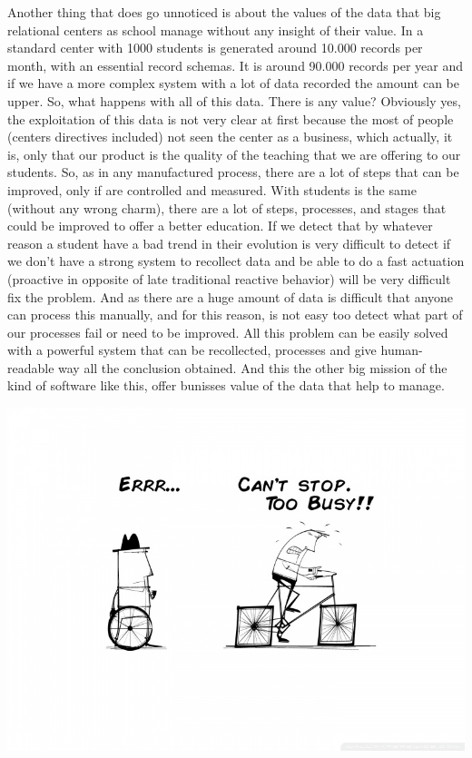 Another thing that does go unnoticed is about the values of the data that big
relational centers as school manage without any insight of their value.
In a standard center with 1000 students is generated around 10.000 records per
month, with an essential record schemas.
\intro
It is around 90.000 records per year
and if we have a more complex system with a lot of data recorded the amount can be upper.
So, what happens with all of this data. There is any value? Obviously yes,
the exploitation of this data is not very clear at first because the most of
people (centers directives included) not seen the center as a business, which
actually, it is, only that our product is the quality of the teaching that we are
offering to our students.
\intro
So, as in any manufactured process, there are a lot of steps that can be improved,
only if are controlled and measured. With students is the same (without any wrong
charm), there are a lot of steps, processes, and stages that could be improved to
offer a better education.
If we detect that by whatever reason a student have a bad trend in their evolution
is very difficult to detect if we don't have a strong system to recollect data
and be able to do a fast actuation (proactive in opposite of late traditional
reactive behavior) will be very difficult fix the problem.
\intro
And as there are a huge amount of data is difficult that anyone can process this
manually, and for this reason, is not easy too detect what part of our processes
fail or need to be improved.
All this problem can be easily solved with a powerful system that can be recollected,
processes and give human-readable way all the conclusion obtained.
\intro
And this the other big mission of the kind of software like this, offer bunisses
value of the data that help to manage.

\includegraphics[scale=0.5]{img/toobusytoimprove.jpeg}

